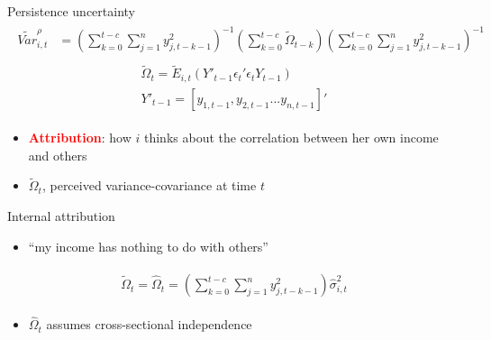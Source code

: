 \documentclass{beamer}
\begin{document}
\begin{frame}{Persistence uncertainty}
	\begin{eqnarray}
	\begin{split}
	\tilde {Var}^{\rho}_{i,t} & =   (\sum^{t-c}_{k=0}\sum^{n}_{j=1}y^2_{j,t-k-1})^{-1}(\sum^{t-c}_{k=0}\tilde \Omega_{t-k})(\sum^{t-c}_{k=0}\sum^{n}_{j=1}y^2_{j,t-k-1})^{-1}
	\end{split}
	\end{eqnarray}
	\begin{eqnarray}
	\begin{split}
	\tilde \Omega_{t} = \tilde E_{i,t}(Y'_{t-1}\epsilon_{t}'\epsilon_{t}Y_{t-1}) \\
	Y'_{t-1} = [y_{1,t-1},y_{2,t-1}...y_{n,t-1}]'
	\end{split}
	\end{eqnarray}
	\begin{itemize}	  
		\item  \textbf{\textcolor{red}{Attribution}}: how $i$ thinks about the correlation between her own income and others		
		\item $\tilde \Omega_{t}$, perceived variance-covariance at time $t$
	\end{itemize}

\end{frame}


\begin{frame}{Internal attribution}
	
	\begin{itemize}
		\item ``my income has nothing to do with others''
	\end{itemize}

	\begin{eqnarray}
		\begin{split}
		\tilde \Omega_{t}  = \widehat \Omega_{t} = (\sum^{t-c}_{k=0}\sum^{n}_{j=1}y^2_{j,t-k-1})\widehat{\sigma}^2_{i,t} 
	\end{split}
	\end{eqnarray}

\begin{itemize}
	\item $\widehat \Omega_{t}$ assumes cross-sectional independence 
\end{itemize}
\end{frame}
\end{document}
